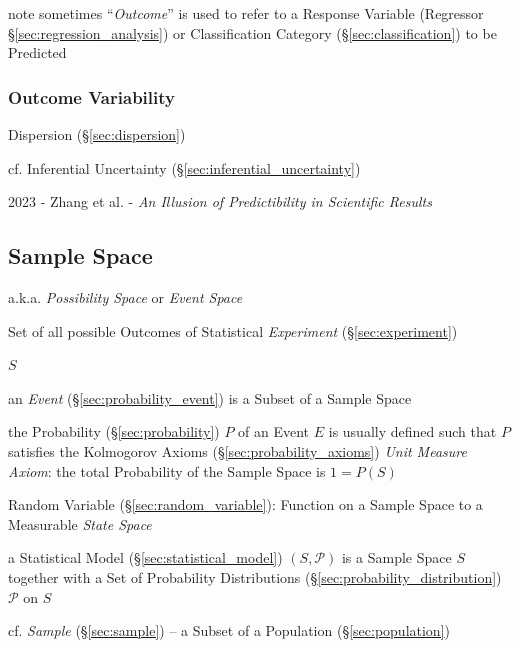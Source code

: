\fist note sometimes ``\emph{Outcome}'' is used to refer to a Response Variable
(Regressor \S\ref{sec:regression_analysis}) or Classification Category
(\S\ref{sec:classification}) to be Predicted



\subsubsection{Outcome Variability}\label{sec:outcome_variability}

Dispersion (\S\ref{sec:dispersion})

cf. Inferential Uncertainty (\S\ref{sec:inferential_uncertainty})

2023 - Zhang et al. - \emph{An Illusion of Predictibility in Scientific Results}



\subsection{Sample Space}\label{sec:sample_space}

a.k.a. \emph{Possibility Space} or \emph{Event Space}

Set of all possible Outcomes of Statistical \emph{Experiment}
(\S\ref{sec:experiment})

$S$

an \emph{Event} (\S\ref{sec:probability_event}) is a Subset of a Sample Space

the Probability (\S\ref{sec:probability}) $P$ of an Event $E$ is usually defined
such that $P$ satisfies the Kolmogorov Axioms (\S\ref{sec:probability_axioms})
\fist \emph{Unit Measure Axiom}: the total Probability of the Sample Space is
$1 = P(S)$

Random Variable (\S\ref{sec:random_variable}): Function on a Sample Space to a
Measurable \emph{State Space}

a Statistical Model (\S\ref{sec:statistical_model}) $(S,\mathcal{P})$ is a
Sample Space $S$ together with a Set of Probability Distributions
(\S\ref{sec:probability_distribution}) $\mathcal{P}$ on $S$

\fist cf. \emph{Sample} (\S\ref{sec:sample}) -- a Subset of a Population
(\S\ref{sec:population})



